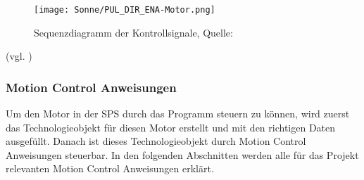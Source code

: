     \begin{figure}[h]
        \centering
        \texttt{[image: Sonne/PUL\_DIR\_ENA-Motor.png]}
        \caption{Sequenzdiagramm der Kontrollsignale, Quelle: \cite{User-Manual_CL57T}}
        \label{Sequenzdiagramm}
    \end{figure}

(vgl. \cite{User-Manual_CL57T})

\subsubsection{Motion Control Anweisungen}
Um den Motor in der SPS durch das Programm steuern zu können, wird zuerst das Technologieobjekt für diesen Motor erstellt und mit den richtigen Daten ausgefüllt. Danach ist dieses Technologieobjekt durch Motion Control Anweisungen steuerbar. In den folgenden Abschnitten werden alle für das Projekt relevanten Motion Control Anweisungen erklärt. 

